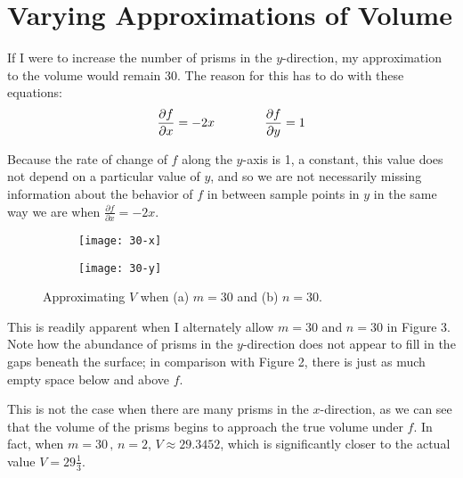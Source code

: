 \documentclass{article}
\begin{document}
\section{Varying Approximations of Volume}

If I were to increase the number of prisms in the $y$-direction, my approximation to the volume would remain 30. 
The reason for this has to do with these equations:
\begin{gather}
    \notag{\frac{\partial f}{\partial x} = -2x} \quad\quad\quad\quad \notag{\frac{\partial f}{\partial y} = 1}
\end{gather}

Because the rate of change of $f$ along the $y$-axis is 1, a constant, this value does not depend on a particular value
of $y$, and so we are not necessarily missing information about the behavior of $f$ in between sample points in $y$ in the
same way we are when $\frac{\partial f}{\partial x} = -2x$. 

\begin{figure}
    \centering
    \begin{subfigure}{.4\textwidth}
        \centering
        \texttt{[image: 30-x]}
    \end{subfigure}
    \begin{subfigure}{.4\textwidth}
        \centering
        \texttt{[image: 30-y]}
    \end{subfigure}
\caption{Approximating $V$ when (a) $m=30$ and (b) $n = 30$.}
\end{figure}
\pagebreak
This is readily apparent when I alternately allow $m = 30$ and $n = 30$
in Figure 3. Note how the abundance of prisms in the $y$-direction does not appear to fill in the gaps beneath the
surface; in comparison with Figure 2, there is just as much empty space below and above $f$. 

This is not the case when there are many prisms in the $x$-direction, as we can see that the volume of the prisms begins to approach the true volume under $f$.
In fact, when $m = 30\, , \, n = 2$, $V \approx 29.3452$, which is significantly closer to the actual value $V = 29\frac{1}{3}$.\\
\end{document}
